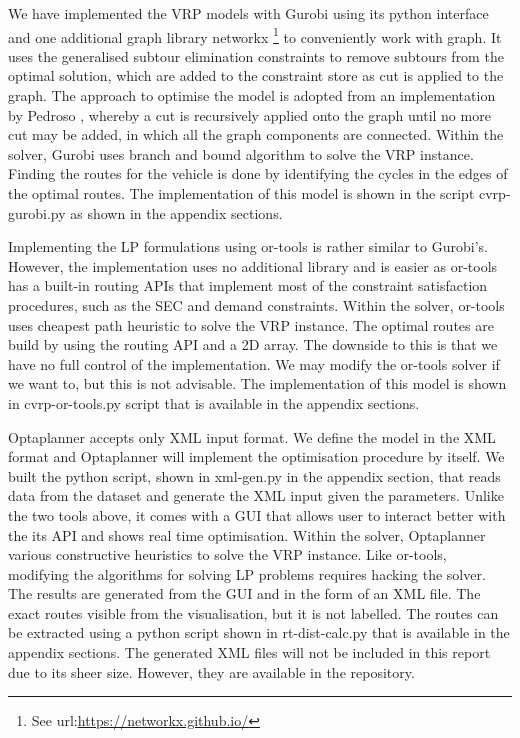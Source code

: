 We have implemented the VRP models with Gurobi using its python interface and one additional graph library networkx
\footnote{See url:\url{https://networkx.github.io/}}
to conveniently work with graph. It uses the generalised subtour elimination constraints
to remove subtours from the optimal solution, which are added to the constraint store as cut is applied to the graph.
The approach to optimise the model is adopted from an implementation by Pedroso \cite{Pedroso2013}, whereby
a cut is recursively applied onto the graph until no more cut may be added,
in which all the graph components are connected. Within the solver, Gurobi uses branch and bound algorithm
to solve the VRP instance.
Finding the routes for the vehicle is done by identifying the cycles in the edges of the optimal routes.
The implementation of this model is shown in the script cvrp-gurobi.py as shown in the appendix sections.

Implementing the LP formulations using or-tools is rather similar to Gurobi's. However, the implementation uses no
additional library and is easier as or-tools has a built-in routing APIs that implement most of the constraint satisfaction
procedures, such as the SEC and demand constraints. Within the solver, or-tools uses cheapest path heuristic
to solve the VRP instance.
The optimal routes are build by using the routing API and a 2D array. The downside to this is that we have no full control of the implementation. We may
modify the or-tools solver if we want to, but this is not advisable.
The implementation of this model is shown in cvrp-or-tools.py script that is available in the appendix sections.

Optaplanner accepts only XML input format. We define the model in the XML format and Optaplanner will
 implement the optimisation procedure by itself.
We built the python script, shown in xml-gen.py in the appendix section, that reads data from the dataset and generate the XML input given the
parameters.
Unlike the two tools above, it comes with a
 GUI that allows user to interact better with the its API and
 shows real time optimisation. Within the solver, Optaplanner various constructive heuristics \cite{Optaplanner}
to solve the VRP instance. Like or-tools, modifying the algorithms
for solving LP problems requires hacking the solver. The results are generated from the GUI and in the form
of an XML file. The exact routes visible from the visualisation, but it is not labelled. The routes can be extracted using
a python script shown in rt-dist-calc.py that is available in the appendix sections. The generated XML files will not be included in this report due to its sheer size. However, they
are available in the repository.

